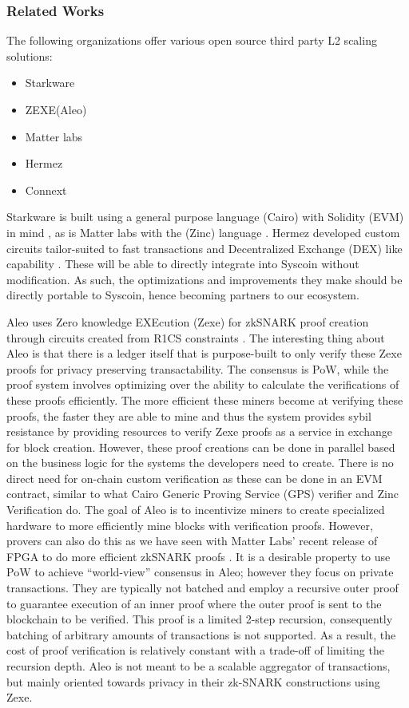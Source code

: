 \documentclass[peerreview]{ieeesyscoin}
\begin{document}
\subsubsection{Related Works}

The following organizations offer various open source third party L2 scaling solutions:

\begin{itemize}
\item Starkware 
\item ZEXE(Aleo) 
\item Matter labs 
\item Hermez
\item Connext 
\end{itemize}

Starkware is built using a general purpose language (Cairo) with Solidity (EVM) in mind \cite{Sta20b}, as is Matter labs with the (Zinc) language \cite{matter21}. Hermez developed custom circuits tailor-suited to fast transactions and Decentralized Exchange (DEX) like capability  \cite{hermez21}. These will be able to directly integrate into Syscoin without modification. As such, the optimizations and improvements they make should be directly portable to Syscoin, hence becoming partners to our ecosystem.

Aleo uses Zero knowledge EXEcution (Zexe) for zkSNARK proof creation through circuits created from R1CS constraints \cite{aleo21}. The interesting thing about Aleo is that there is a ledger itself that is purpose-built to only verify these Zexe proofs for privacy preserving transactability. The consensus is PoW, while the proof system involves optimizing over the ability to calculate the verifications of these proofs efficiently. The more efficient these miners become at verifying these proofs, the faster they are able to mine and thus the system provides sybil resistance by providing resources to verify Zexe proofs as a service in exchange for block creation. However, these proof creations can be done in parallel based on the business logic for the systems the developers need to create. There is no direct need for on-chain custom verification as these can be done in an EVM contract, similar to what Cairo Generic Proving Service (GPS) verifier and Zinc Verification do. The goal of Aleo is to incentivize miners to create specialized hardware to more efficiently mine blocks with verification proofs. However, provers can also do this as we have seen with Matter Labs’ recent release of FPGA to do more efficient zkSNARK proofs \cite{Glu20}. It is a desirable property to use PoW to achieve “world-view” consensus in Aleo; however they focus on private transactions. They are typically not batched and employ a recursive outer proof to guarantee execution of an inner proof where the outer proof is sent to the blockchain to be verified. This proof is a limited 2-step recursion, consequently batching of arbitrary amounts of transactions is not supported. As a result, the cost of proof verification is relatively constant with a trade-off of limiting the recursion depth. Aleo is not meant to be a scalable aggregator of transactions, but mainly oriented towards privacy in their zk-SNARK constructions using Zexe.
\end{document}
